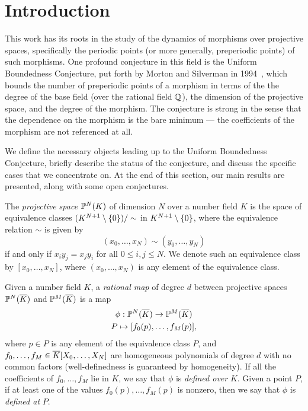 \section{Introduction}
\label{sec:bg}

This work has its roots in the study of the dynamics of morphisms over
projective spaces, specifically the periodic points (or more
generally, preperiodic points) of such morphisms. One profound
conjecture in this field is the Uniform Boundedness Conjecture, put
forth by Morton and Silverman in 1994~\cite{MR1264933}, which bounds
the number of preperiodic points of a morphism in terms of the the
degree of the base field (over the rational field $\Q$), the dimension
of the projective space, and the degree of the morphism. The
conjecture is strong in the sense that the dependence on the morphism
is the bare minimum --- the coefficients of the morphism are not
referenced at all.

We define the necessary objects leading up to the Uniform Boundedness
Conjecture, briefly describe the status of the conjecture, and discuss
the specific cases that we concentrate on. At the end of this section,
our main results are presented, along with some open conjectures.

\begin{definition}
  The \emph{projective space} $\P^N(K)$ of dimension $N$ over a number
  field $K$ is the space of equivalence classes $(K^{N+1} \setminus
  \set{0})/\sim$ in $K^{N+1} \setminus \set{0}$, where the equivalence
  relation $\sim$ is given by
  \[
  (x_0, \dots, x_N) \sim (y_0, \dots, y_N)
  \]
  if and only if $x_i y_j = x_j y_i$ for all $0 \le i, j \le N$. We
  denote such an equivalence class by $[x_0, \dots, x_N]$, where
  $(x_0, \dots, x_N)$ is any element of the equivalence class.
\end{definition}

\begin{definition}
  Given a number field $K$, a \emph{rational map} of degree $d$
  between projective spaces $\P^N(\ol{K})$ and $\P^M(\ol{K})$ is a
  map
  \[
  \begin{gathered}
    \phi: \P^N(\ol{K}) \to \P^M(\ol{K})\\
    P \mapsto [f_0(p), \dots, f_M(p)],
  \end{gathered}
  \]
  where $p \in P$ is any element of the equivalence class $P$, and
  $f_0, \dots, f_M \in \ol{K}[X_0, \dots, X_N]$ are homogeneous
  polynomials of degree $d$ with no common factors (well-definedness
  is guaranteed by homogeneity). If all the coefficients of $f_0,
  \dots, f_M$ lie in $K$, we say that $\phi$ is \emph{defined over}
  $K$. Given a point $P$, if at least one of the values $f_0(p),
  \dots, f_M(p)$ is nonzero, then we say that $\phi$ is \emph{defined
    at} $P$.
\end{definition}

